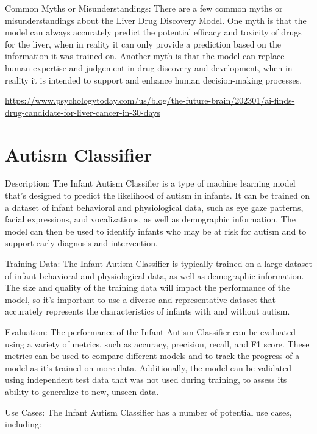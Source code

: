 Common Myths or Misunderstandings:
There are a few common myths or misunderstandings about the Liver Drug Discovery Model. One myth is that the model can always accurately predict the potential efficacy and toxicity of drugs for the liver, when in reality it can only provide a prediction based on the information it was trained on. Another myth is that the model can replace human expertise and judgement in drug discovery and development, when in reality it is intended to support and enhance human decision-making processes.

\url{https://www.psychologytoday.com/us/blog/the-future-brain/202301/ai-finds-drug-candidate-for-liver-cancer-in-30-days}

\section{Autism Classifier}

Description:
The Infant Autism Classifier is a type of machine learning model that's designed to predict the likelihood of autism in infants. It can be trained on a dataset of infant behavioral and physiological data, such as eye gaze patterns, facial expressions, and vocalizations, as well as demographic information. The model can then be used to identify infants who may be at risk for autism and to support early diagnosis and intervention.

Training Data:
The Infant Autism Classifier is typically trained on a large dataset of infant behavioral and physiological data, as well as demographic information. The size and quality of the training data will impact the performance of the model, so it's important to use a diverse and representative dataset that accurately represents the characteristics of infants with and without autism.

Evaluation:
The performance of the Infant Autism Classifier can be evaluated using a variety of metrics, such as accuracy, precision, recall, and F1 score. These metrics can be used to compare different models and to track the progress of a model as it's trained on more data. Additionally, the model can be validated using independent test data that was not used during training, to assess its ability to generalize to new, unseen data.

Use Cases:
The Infant Autism Classifier has a number of potential use cases, including:

